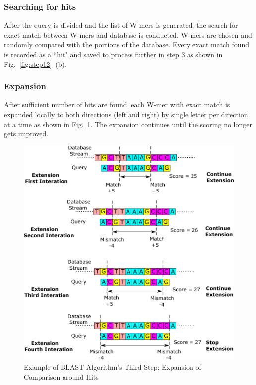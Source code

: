 \subsubsection{\bf Searching for hits}
After the query is divided and the list of W-mers is generated, the search for exact match between W-mers and database is conducted.
W-mers are chosen and randomly compared with the portions of the database. 
Every exact match found is recorded as a ``hit" and saved to process further in step 3 as shown in Fig.~\ref{fig:step12}~(b). 


\subsubsection{\bf Expansion}
After sufficient number of hits are found, each W-mer with exact match is expanded locally to both directions (left and right) by single letter per direction at a time as shown in Fig.~\ref{fig:step3}. 
The expansion continues until the scoring no longer gets improved.
\begin{figure}[t!]
\centering
    \includegraphics[width=\columnwidth]{Figures/Algorithm3.pdf}
    \caption{Example of BLAST Algorithm's Third Step: Expansion of Comparison around Hits} 
    \label{fig:step3}
    \vspace{-3 mm}
\end{figure}
